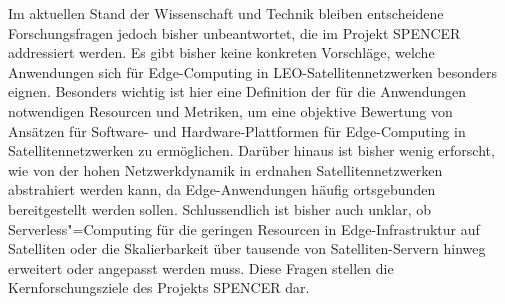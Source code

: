 Im aktuellen Stand der Wissenschaft und Technik bleiben entscheidene Forschungsfragen jedoch bisher unbeantwortet, die im Projekt SPENCER addressiert werden.
Es gibt bisher keine konkreten Vorschläge, welche Anwendungen sich für Edge-Computing in LEO-Satellitennetzwerken besonders eignen.
Besonders wichtig ist hier eine Definition der für die Anwendungen notwendigen Resourcen und Metriken, um eine objektive Bewertung von Ansätzen für Software- und Hardware-Plattformen für Edge-Computing in Satellitennetzwerken zu ermöglichen.
Darüber hinaus ist bisher wenig erforscht, wie von der hohen Netzwerkdynamik in erdnahen Satellitennetzwerken abstrahiert werden kann, da Edge-Anwendungen häufig ortsgebunden bereitgestellt werden sollen.
Schlussendlich ist bisher auch unklar, ob Serverless"=Computing für die geringen Resourcen in Edge-Infrastruktur auf Satelliten oder die Skalierbarkeit über tausende von Satelliten-Servern hinweg erweitert oder angepasst werden muss.
Diese Fragen stellen die Kernforschungsziele des Projekts SPENCER dar.

